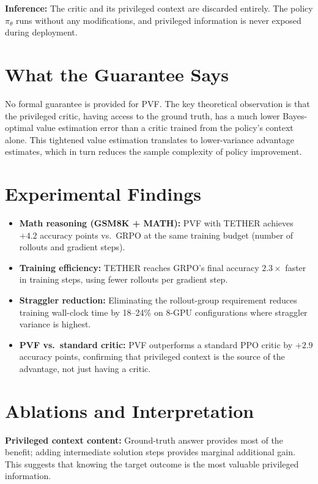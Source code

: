 \documentclass[10pt,twocolumn]{article}
\begin{document}
\textbf{Inference:} The critic and its privileged context are
discarded entirely. The policy $\pi_\theta$ runs without any
modifications, and privileged information is never exposed during
deployment.

\section{What the Guarantee Says}

No formal guarantee is provided for PVF. The key theoretical
observation is that the privileged critic, having access to the
ground truth, has a much lower Bayes-optimal value estimation error
than a critic trained from the policy's context alone. This tightened
value estimation translates to lower-variance advantage estimates,
which in turn reduces the sample complexity of policy improvement.

\section{Experimental Findings}

\begin{itemize}[itemsep=2pt,parsep=0pt]
  \item \textbf{Math reasoning (GSM8K + MATH):} PVF with TETHER
    achieves $+4.2$ accuracy points vs.\ GRPO at the same training
    budget (number of rollouts and gradient steps).
  \item \textbf{Training efficiency:} TETHER reaches GRPO's final
    accuracy $2.3\times$ faster in training steps, using
    fewer rollouts per gradient step.
  \item \textbf{Straggler reduction:} Eliminating the rollout-group
    requirement reduces training wall-clock time by 18--24\% on
    8-GPU configurations where straggler variance is highest.
  \item \textbf{PVF vs.\ standard critic:} PVF outperforms a standard
    PPO critic by $+2.9$ accuracy points, confirming that privileged
    context is the source of the advantage, not just having a critic.
\end{itemize}

\section{Ablations and Interpretation}

\textbf{Privileged context content:} Ground-truth answer provides
most of the benefit; adding intermediate solution steps provides
marginal additional gain. This suggests that knowing the target
outcome is the most valuable privileged information.
\end{document}
